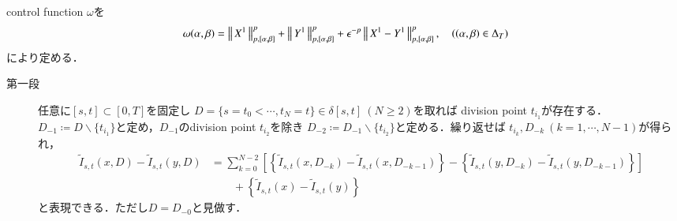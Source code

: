 	\begin{prf}
		control function $\omega$を
		\begin{align}
			\omega(\alpha,\beta) = \left\|\, X^1\, \right\|_{p,[\alpha,\beta]}^p + \left\|\, Y^1\, \right\|_{p,[\alpha,\beta]}^p + \epsilon^{-p} \left\|\, X^1 - Y^1\, \right\|_{p,[\alpha,\beta]}^p,
			\quad ((\alpha,\beta) \in \Delta_T)
		\end{align}
		により定める．
		\begin{description}
			\item[第一段]
				任意に$[s,t] \subset [0,T]$を固定し
				$D = \{s=t_0 < \cdots, t_N=t\} \in \delta[s,t]\ (N \geq 2)$を取れば
				division point $t_{i_1}$が存在する．
				$D_{-1} \coloneqq D \backslash \{t_{i_1}\}$と定め，$D_{-1}$のdivision point $t_{i_2}$を除き
				$D_{-2} \coloneqq D_{-1} \backslash \{t_{i_2}\}$と定める．繰り返せば
				$t_{i_k},D_{-k}\ (k=1,\cdots,N-1)$が得られ，
				\begin{align}
					\tilde{I}_{s,t}(x,D) - \tilde{I}_{s,t}(y,D)
					&= \sum_{k=0}^{N-2} \left[ \left\{ \tilde{I}_{s,t}(x,D_{-k}) - \tilde{I}_{s,t}(x,D_{-k-1}) \right\} - 
						\left\{ \tilde{I}_{s,t}(y,D_{-k}) - \tilde{I}_{s,t}(y,D_{-k-1}) \right\} \right] \label{eq:continuity_theorem_1_1}\\
					&\qquad + \left\{ \tilde{I}_{s,t}(x) - \tilde{I}_{s,t}(y) \right\}	\label{eq:continuity_theorem_1_2}
				\end{align}
				と表現できる．ただし$D = D_{-0}$と見做す．
			

\end{description}
\end{prf}
